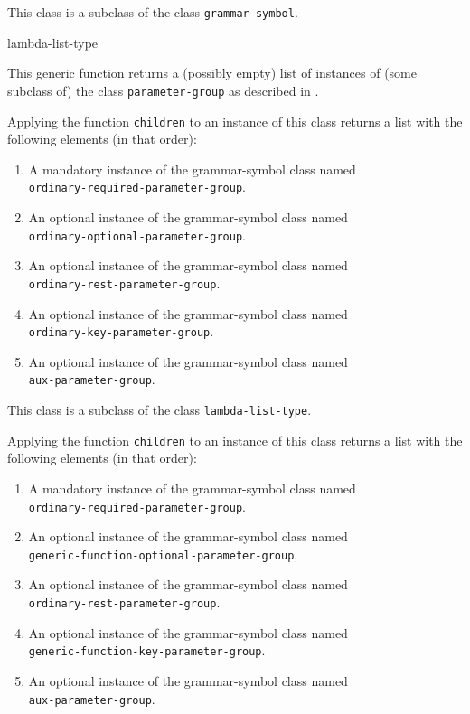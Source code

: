 
This class is a subclass of the class \texttt{grammar-symbol}.

 {lambda-list-type}

This generic function returns a (possibly empty) list of instances of
(some subclass of) the class \texttt{parameter-group} as described in
.


Applying the function \texttt{children} to an instance of this class
returns a list with the following elements (in that order):

\begin{enumerate}
\item A mandatory instance of the grammar-symbol class named\\
  \texttt{ordinary-required-parameter-group}.
\item An optional instance of the grammar-symbol class named\\
  \texttt{ordinary-optional-parameter-group}.
\item An optional instance of the grammar-symbol class named\\
\texttt{ordinary-rest-parameter-group}.
\item An optional instance of the grammar-symbol class named\\
\texttt{ordinary-key-parameter-group}.
\item An optional instance of the grammar-symbol class named\\
\texttt{aux-parameter-group}.
\end{enumerate}

This class is a subclass of the class \texttt{lambda-list-type}.


Applying the function \texttt{children} to an instance of this class
returns a list with the following elements (in that order):

\begin{enumerate}
\item A mandatory instance of the grammar-symbol class named\\
  \texttt{ordinary-required-parameter-group}.
\item An optional instance of the grammar-symbol class named\\
\texttt{generic-function-optional-parameter-group},
\item An optional instance of the grammar-symbol class named\\
\texttt{ordinary-rest-parameter-group}.
\item An optional instance of the grammar-symbol class named\\
\texttt{generic-function-key-parameter-group}.
\item An optional instance of the grammar-symbol class named\\
\texttt{aux-parameter-group}.
\end{enumerate}

